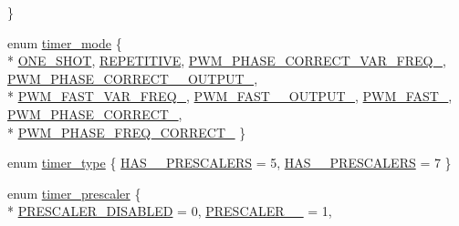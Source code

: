 \begin{DoxyCompactItemize}
 \}
\item 
enum \hyperlink{namespacemhvlib_a469ae797645536ad6a46c129233a9f45}{timer\-\_\-mode} \{ \\*
\hyperlink{namespacemhvlib_a469ae797645536ad6a46c129233a9f45a6484acd2b6f1f15eac8e620ec49b574c}{O\-N\-E\-\_\-\-S\-H\-O\-T}, 
\hyperlink{namespacemhvlib_a469ae797645536ad6a46c129233a9f45aedbc5d7904b91982e9265e3b453cb283}{R\-E\-P\-E\-T\-I\-T\-I\-V\-E}, 
\hyperlink{namespacemhvlib_a469ae797645536ad6a46c129233a9f45a356e18207516f3244ab8f340fbc79feb}{P\-W\-M\-\_\-\-P\-H\-A\-S\-E\-\_\-\-C\-O\-R\-R\-E\-C\-T\-\_\-\-V\-A\-R\-\_\-\-F\-R\-E\-Q\-\_}, 
\hyperlink{namespacemhvlib_a469ae797645536ad6a46c129233a9f45a108ace45db505dfc0c509cb4316323ba}{P\-W\-M\-\_\-\-P\-H\-A\-S\-E\-\_\-\-C\-O\-R\-R\-E\-C\-T\-\_\-\_\-\-O\-U\-T\-P\-U\-T\-\_}, 
\\*
\hyperlink{namespacemhvlib_a469ae797645536ad6a46c129233a9f45aca343ad6b3b9ccd1ad96651d3b06f271}{P\-W\-M\-\_\-\-F\-A\-S\-T\-\_\-\-V\-A\-R\-\_\-\-F\-R\-E\-Q\-\_}, 
\hyperlink{namespacemhvlib_a469ae797645536ad6a46c129233a9f45ad28f628afc20685336cd6c185ba584f1}{P\-W\-M\-\_\-\-F\-A\-S\-T\-\_\-\_\-\-O\-U\-T\-P\-U\-T\-\_}, 
\hyperlink{namespacemhvlib_a469ae797645536ad6a46c129233a9f45a12ff6c8e9fdb86df059214056931052b}{P\-W\-M\-\_\-\-F\-A\-S\-T\-\_}, 
\hyperlink{namespacemhvlib_a469ae797645536ad6a46c129233a9f45a45765b516338cfadf1aed9a70fe05ccd}{P\-W\-M\-\_\-\-P\-H\-A\-S\-E\-\_\-\-C\-O\-R\-R\-E\-C\-T\-\_}, 
\\*
\hyperlink{namespacemhvlib_a469ae797645536ad6a46c129233a9f45ab45cd624451a22ae0d0bb24e91fd83ec}{P\-W\-M\-\_\-\-P\-H\-A\-S\-E\-\_\-\-F\-R\-E\-Q\-\_\-\-C\-O\-R\-R\-E\-C\-T\-\_}
 \}
\item 
enum \hyperlink{namespacemhvlib_af9698df07d406d27bd41ad19b2cd15e5}{timer\-\_\-type} \{ \hyperlink{namespacemhvlib_af9698df07d406d27bd41ad19b2cd15e5acc79a96a7b1c2338d6e299040b50657a}{H\-A\-S\-\_\-\_\-\-P\-R\-E\-S\-C\-A\-L\-E\-R\-S} =  5, 
\hyperlink{namespacemhvlib_af9698df07d406d27bd41ad19b2cd15e5a7c45810094f7c2d09557b405b929c3c1}{H\-A\-S\-\_\-\_\-\-P\-R\-E\-S\-C\-A\-L\-E\-R\-S} =  7
 \}
\item 
enum \hyperlink{namespacemhvlib_aef19ff50231eab9355114c5bc20ffead}{timer\-\_\-prescaler} \{ \\*
\hyperlink{namespacemhvlib_aef19ff50231eab9355114c5bc20ffeadafcf4b64ca8c3cceb035c90adf8c464bb}{P\-R\-E\-S\-C\-A\-L\-E\-R\-\_\-\-D\-I\-S\-A\-B\-L\-E\-D} =  0, 
\hyperlink{namespacemhvlib_aef19ff50231eab9355114c5bc20ffeada1936785fc53c16f7aed1561ff2cd6dbd}{P\-R\-E\-S\-C\-A\-L\-E\-R\-\_\-\_} =  1, 

\end{DoxyCompactItemize}
